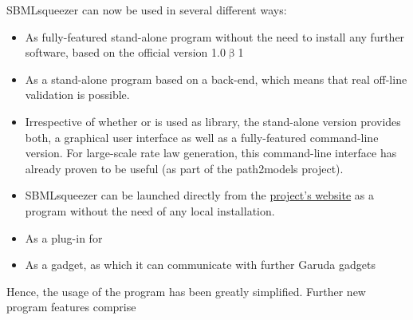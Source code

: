 SBMLsqueezer can now be used in several different ways:
\begin{itemize}
\item As fully-featured stand-alone program without the need to install any
      further software, based on the official \JSBML version  1.0$\upbeta$1
\item As a stand-alone program based on a \libSBML back-end, which means that
      real off-line \SBML validation is possible.
\item Irrespective of whether \JSBML or \libSBML is used as \SBML library, the
      stand-alone version provides both, a graphical user interface as well as
      a fully-featured command-line version. For large-scale rate law
      generation, this command-line interface has already proven to be useful
      (as part of the path2models project).
\item SBMLsqueezer can be launched directly from the
      \href{http://www.cogsys.cs.uni-tuebingen.de/software/SBMLsqueezer/}{project's website}
      as a \JavaWebStart program without the need of any local installation.
\item As a plug-in for 
\item As a \Garuda gadget, as which it can communicate with further Garuda
      gadgets
\end{itemize}
Hence, the usage of the program has been greatly simplified.
Further new program features comprise
